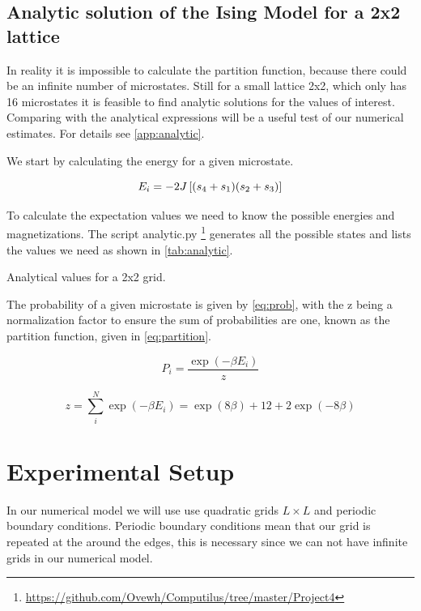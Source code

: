 \subsection{Analytic solution of the Ising Model for a 2x2 lattice}
In reality it is impossible to calculate the partition function, because there
could be an infinite number of microstates. Still for a small lattice 2x2, which
only has 16 microstates it is
feasible to find analytic solutions for the values of
interest. Comparing with the analytical expressions will be a useful test of our
numerical estimates. For details see \cref{app:analytic}.

We start by calculating the energy for a given microstate.

\begin{equation}
  E_i = -2J\left[(s_4 + s_1)(s_2+s_3)\right]
\end{equation}

To calculate the expectation values we need to know the possible energies and
magnetizations. The script analytic.py
\footnote{\url{https://github.com/Ovewh/Computilus/tree/master/Project4}}
generates all the possible states and lists the values we need as shown in
\cref{tab:analytic}.

\begin{table}[h]
  \centering
  \caption{Analytical values for a 2x2 grid.}
  \label{tab:analytic}
\end{table}

The probability of a given microstate is given by \cref{eq:prob}, with the z
being a normalization factor to ensure the sum of probabilities are one, known
as the partition function, given in \cref{eq:partition}.


\begin{equation}
  \label{eq:prob}
  P_i = \frac{\exp(-\beta E_i)}{z}
\end{equation}

\begin{equation}
  \label{eq:partition}
  z = \sum_{i}^{N} \exp(-\beta E_i) = \exp(8\beta) + 12 + 2\exp(-8\beta)
\end{equation}


\section{Experimental Setup}
In our numerical model we will use  use quadratic grids $L\times L$ and
periodic boundary conditions. Periodic boundary conditions mean that our grid is
repeated at the around the edges, this is necessary since we can not have
infinite grids in our numerical model.


